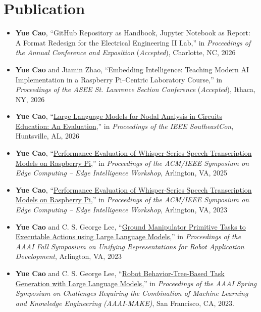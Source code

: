 \documentclass[12pt]{article}
\begin{document}
\section*{Publication}
\begin{itemize}[leftmargin=1.5em]
\item[] \textbf{Yue Cao}, ``GitHub Repository as Handbook, Jupyter Notebook as Report: A Format Redesign for the Electrical Engineering II Lab,'' in {\em Proceedings of the Annual Conference and Exposition} (\textit{Accepted}), Charlotte, NC, 2026
\item[] \textbf{Yue Cao} and Jiamin Zhao, ``Embedding Intelligence: Teaching Modern AI Implementation in a Raspberry Pi–Centric Laboratory Course,'' in {\em Proceedings of the ASEE St. Lawrence Section Conference} (\textit{Accepted}), Ithaca, NY, 2026
\item[] \textbf{Yue Cao}, ``\href{https://ieeexplore.ieee.org/document/11476570}{Large Language Models for Nodal Analysis in Circuits Education: An Evaluation},'' in {\em Proceedings of the IEEE SoutheastCon}, Huntsville, AL, 2026
\item[] \textbf{Yue Cao}, ``\href{https://dl.acm.org/doi/10.1145/3769102.3774244}{Performance Evaluation of Whisper-Series Speech Transcription Models on Raspberry Pi},'' in {\em Proceedings of the ACM/IEEE Symposium on Edge Computing -- Edge Intelligence Workshop}, Arlington, VA, 2025
\item[] \textbf{Yue Cao}, ``\href{https://dl.acm.org/doi/10.1145/3769102.3774244}{Performance Evaluation of Whisper-Series Speech Transcription Models on Raspberry Pi},'' in {\em Proceedings of the ACM/IEEE Symposium on Edge Computing -- Edge Intelligence Workshop}, Arlington, VA, 2023
\item[] \textbf{Yue Cao} and C. S. George Lee, ``\href{https://ojs.aaai.org/index.php/AAAI-SS/article/view/27720}{Ground Manipulator Primitive Tasks to Executable Actions
using Large Language Models},'' in {\em Proceedings of the  AAAI Fall Symposium on Unifying Representations for Robot Application Development}, Arlington, VA, 2023
   \item[] \textbf{Yue Cao} and C. S. George Lee, ``\href{https://ceur-ws.org/Vol-3433/paper4.pdf}{Robot Behavior-Tree-Based Task Generation with Large Language Models},'' in {\em Proceedings of the AAAI Spring
Symposium on Challenges Requiring the Combination of Machine
Learning and Knowledge Engineering (AAAI-MAKE)}, San Francisco, CA, 2023.


\end{itemize}
\end{document}
